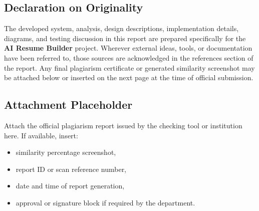 \subsection*{Declaration on Originality}
\noindent The developed system, analysis, design descriptions, implementation details, diagrams, and testing discussion in this report are prepared specifically for the \textbf{AI Resume Builder} project. Wherever external ideas, tools, or documentation have been referred to, those sources are acknowledged in the references section of the report. Any final plagiarism certificate or generated similarity screenshot may be attached below or inserted on the next page at the time of official submission.

\subsection*{Attachment Placeholder}
\noindent Attach the official plagiarism report issued by the checking tool or institution here. If available, insert:
\begin{itemize}
\item similarity percentage screenshot,
\item report ID or scan reference number,
\item date and time of report generation,
\item approval or signature block if required by the department.
\end{itemize}
